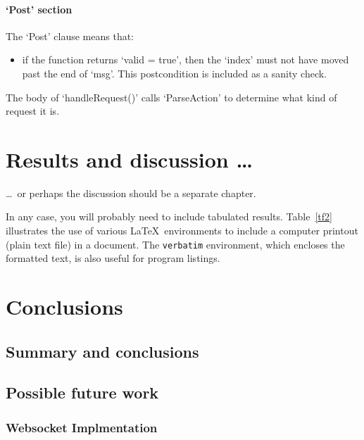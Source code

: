 \documentclass[12pt,openany,a4paper]{book}
\newcommand{\tab}[1]  {Table~\ref{#1}}		%
\begin{document}
\subsubsection{`Post' section}
The `Post' clause means that:
\begin{itemize}
\item if the function returns `valid = true', then the `index' must not have moved past the end of `msg'. This postcondition is included as a sanity check. 
\end{itemize}

The body of `handleRequest()' calls `ParseAction' to determine what kind of request it is.



\chapter{Results and discussion \ldots}

\ldots\ or perhaps the discussion should be a separate chapter.

In any case, you will probably need to include tabulated results.
\tab{tf2} illustrates the use of various \LaTeX\ environments to
include a computer printout (plain text file) in a document.  The
\texttt{verbatim} environment, which encloses the formatted text, is
also useful for program listings.

\chapter{Conclusions}

\section{Summary and conclusions}

\section{Possible future work}
\subsection{Websocket Implmentation}


\appendix


\newpage
{}
\mbox{}
\newpage
\end{document}
